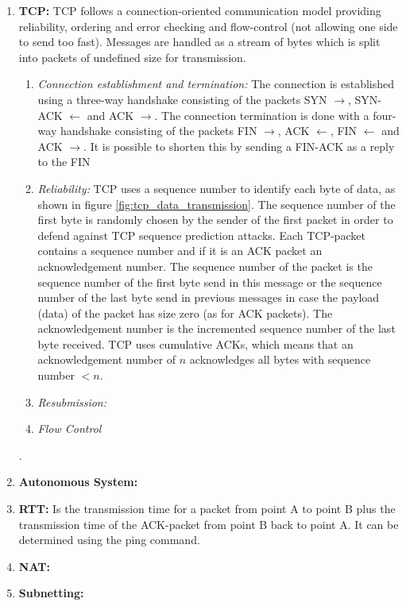\begin{enumerate}
      \item \textbf{\acf{TCP}:} \ac{TCP} follows a connection-oriented communication model providing reliability, ordering and error checking and flow-control (not allowing one side to send too fast). Messages are handled as a stream of bytes which is split into packets of undefined size for transmission.
            \begin{enumerate}
                  \item \textit{Connection establishment and termination:} The connection is established using a three-way handshake consisting of the packets SYN $\rightarrow$, SYN-ACK $\leftarrow$ and ACK $\rightarrow$. The connection termination is done with a four-way handshake consisting of the packets FIN $\rightarrow$, ACK $\leftarrow$, FIN $\leftarrow$ and ACK $\rightarrow$. It is possible to shorten this by sending a FIN-ACK as a reply to the FIN
                  \item \textit{Reliability:} \ac{TCP} uses a sequence number to identify each byte of data, as shown in figure \ref{fig:tcp_data_transmission}. The sequence number of the first byte is randomly chosen by the sender of the first packet in order to defend against TCP sequence prediction attacks. Each \ac{TCP}-packet contains a sequence number and \textendash{} if it is an ACK packet \textendash{} an acknowledgement number. The sequence number of the packet is the sequence number of the first byte send in this message or the sequence number of the last byte send in previous messages in case the payload (data) of the packet has size zero (as for ACK packets). The acknowledgement number is the incremented sequence number of the last byte received. TCP uses cumulative ACKs, which means that an acknowledgement number of $n$ acknowledges all bytes with sequence number $< n$.
                  \item \textit{Resubmission:} 
                  \item \textit{Flow Control}
            \end{enumerate}

            .
      \item \textbf{Autonomous System:}
      \item \textbf{\acf{RTT}:} Is the transmission time for a packet from point A to point B plus the transmission time of the ACK-packet from point B back to point A. It can be determined using the ping command.
      \item \textbf{\acf{NAT}:}
      \item \textbf{Subnetting:}
\end{enumerate}

